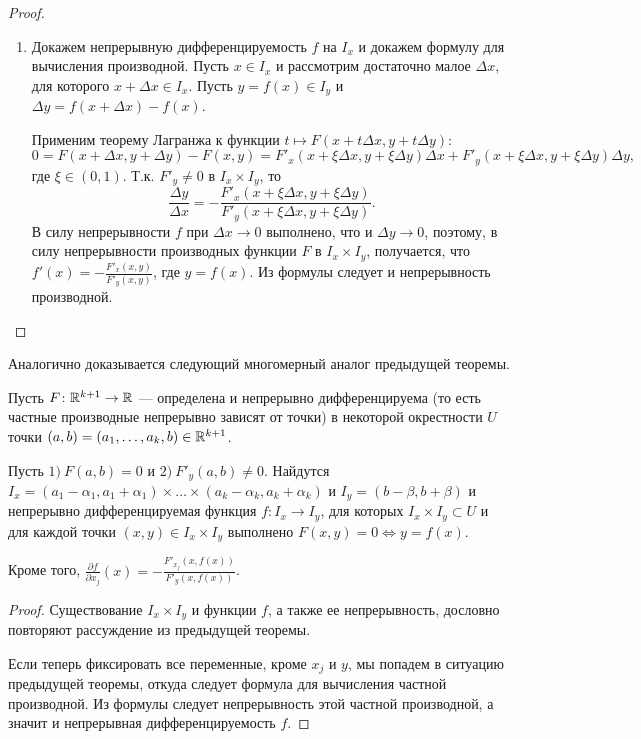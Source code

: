 \documentclass[a4paper]{article}
\theoremstyle{named}
\begin{document}
\begin{proof}
\begin{enumerate}
        \item
            Докажем непрерывную дифференцируемость $f$ на $I_x$ и докажем формулу для вычисления производной. Пусть $x\in I_x$ и рассмотрим достаточно малое $\Delta x$, для которого $x+\Delta x\in I_x$. Пусть $y=f(x)\in I_y$ и $\Delta y= f(x+\Delta x) - f(x)$.

            Применим теорему Лагранжа к функции $t\mapsto F(x+t\Delta x, y+t\Delta y)$:
            $$
                0 
                = F(x+\Delta x, y+\Delta y) - F(x,y)
                = F'_x(x+\xi\Delta x, y+\xi\Delta y)\Delta x + F'_y(x+\xi\Delta x, y+\xi\Delta y)\Delta y,
            $$
            где $\xi\in(0,1)$. Т.к. $F'_y\ne0$ в $I_x\times I_y$,
            то
            $$
                \frac{\Delta y}{\Delta x} = -\frac{F'_x(x+\xi\Delta x, y+\xi\Delta y)}{F'_y(x+\xi\Delta x, y+\xi\Delta y)}.
            $$
            В силу непрерывности $f$ при $\Delta x\to 0$ выполнено, что и $\Delta y\to 0$, поэтому, в силу непрерывности производных функции $F$ в $I_x\times I_y$, получается, что $f'(x) = -\frac{F'_x(x,y)}{F'_y(x,y)}$, где $y=f(x)$. Из формулы следует и непрерывность производной.
        \end{enumerate}
    \end{proof}

    Аналогично доказывается следующий многомерный аналог предыдущей теоремы.

    \begin{theorem*}
        Пусть $F\colon \mathbb{R}^{k+1}\to \mathbb{R}$ --- определена и непрерывно дифференцируема (то есть частные производные непрерывно зависят от точки) в некоторой окрестности $U$ точки $(a,b)=(a_1,\ldots, a_k,b)\in \mathbb{R}^{k+1}$.

        Пусть $1)\ F(a,b)=0$ и  $2)\ F'_y(a,b)\ne0$. Найдутся $I_x = (a_1-\alpha_1, a_1+\alpha_1)\times\ldots\times (a_k-\alpha_k, a_k+\alpha_k)$ и $I_y=(b-\beta, b+\beta)$ и непрерывно дифференцируемая функция $f\colon I_x\to I_y$, для которых $I_x\times I_y\subset U$ и для каждой точки $(x,y)\in I_x\times I_y$ выполнено $F(x,y)=0 \Leftrightarrow y=f(x)$. 

        Кроме того, $\frac{\partial f}{\partial x_j}(x)=-\frac{F'_{x_j}(x,f(x))}{F'_y(x,f(x))}$.
    \end{theorem*}

    \begin{proof}
        Существование $I_x\times I_y$ и функции $f$, а также ее непрерывность, дословно повторяют рассуждение из предыдущей теоремы.

        Если теперь фиксировать все переменные, кроме $x_j$ и $y$, мы попадем в ситуацию предыдущей теоремы, откуда следует формула для вычисления частной производной. Из формулы следует непрерывность этой частной производной, а значит и непрерывная дифференцируемость $f$.
    \end{proof}
\end{document}
